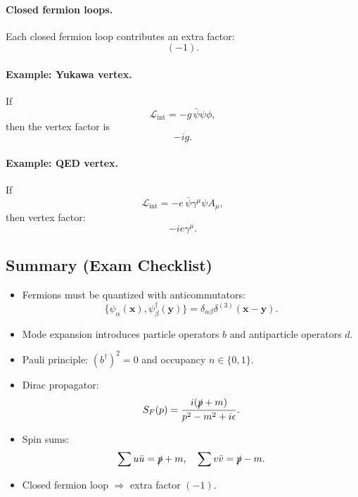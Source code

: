 \paragraph{Closed fermion loops.}
Each closed fermion loop contributes an extra factor:
\begin{equation}
(-1).
\end{equation}

\paragraph{Example: Yukawa vertex.}
If
\begin{equation}
\mathcal{L}_{\mathrm{int}}=-g\,\bar{\psi}\psi\phi,
\end{equation}
then the vertex factor is
\begin{equation}
-i g.
\end{equation}

\paragraph{Example: QED vertex.}
If
\begin{equation}
\mathcal{L}_{\mathrm{int}}=-e\,\bar{\psi}\gamma^\mu\psi A_\mu,
\end{equation}
then vertex factor:
\begin{equation}
-ie\gamma^\mu.
\end{equation}

\subsection{Summary (Exam Checklist)}
\begin{itemize}
\item Fermions must be quantized with anticommutators:
\[
\{\psi_\alpha(\mathbf{x}),\psi_\beta^\dagger(\mathbf{y})\}=\delta_{\alpha\beta}\delta^{(3)}(\mathbf{x}-\mathbf{y}).
\]
\item Mode expansion introduces particle operators $b$ and antiparticle operators $d$.
\item Pauli principle: $(b^\dagger)^2=0$ and occupancy $n\in\{0,1\}$.
\item Dirac propagator:
\[
S_F(p)=\frac{i(\slashed{p}+m)}{p^2-m^2+i\epsilon}.
\]
\item Spin sums:
\[
\sum u\bar{u}=\slashed{p}+m,\quad \sum v\bar{v}=\slashed{p}-m.
\]
\item Closed fermion loop $\Rightarrow$ extra factor $(-1)$.
\end{itemize}

